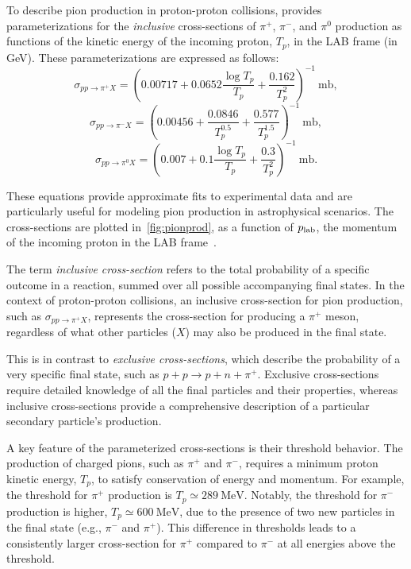 To describe pion production in proton-proton collisions, \cite{Norbury2009nimpb} provides parameterizations for the \emph{inclusive} cross-sections of \(\pi^+\), \(\pi^-\), and \(\pi^0\) production as functions of the kinetic energy of the incoming proton, \(T_p\), in the LAB frame (in GeV). These parameterizations are expressed as follows:  
\begin{equation}
\sigma_{pp \rightarrow \pi^+ X} = \left( 0.00717 + 0.0652 \frac{\log T_p}{T_p} + \frac{0.162}{T_p^2} \right)^{-1}~\text{mb}, 
\end{equation}
\begin{equation}
\sigma_{pp \rightarrow \pi^- X} = \left( 0.00456 + \frac{0.0846}{T_p^{0.5}} + \frac{0.577}{T_p^{1.5}} \right)^{-1}~\text{mb}, 
\end{equation}
\begin{equation}
\sigma_{pp \rightarrow \pi^0 X} = \left( 0.007 + 0.1 \frac{\log T_p}{T_p} + \frac{0.3}{T_p^2} \right)^{-1}~\text{mb}.
\end{equation}  

These equations provide approximate fits to experimental data and are particularly useful for modeling pion production in astrophysical scenarios. The cross-sections are plotted in~\ref{fig:pionprod}, as a function of \(p_{\rm lab}\), the momentum of the incoming proton in the LAB frame~.  

The term \emph{inclusive cross-section} refers to the total probability of a specific outcome in a reaction, summed over all possible accompanying final states. In the context of proton-proton collisions, an inclusive cross-section for pion production, such as \(\sigma_{pp \rightarrow \pi^+ X}\), represents the cross-section for producing a \(\pi^+\) meson, regardless of what other particles (\(X\)) may also be produced in the final state.  

This is in contrast to \emph{exclusive cross-sections}, which describe the probability of a very specific final state, such as \(p + p \rightarrow p + n + \pi^+\). Exclusive cross-sections require detailed knowledge of all the final particles and their properties, whereas inclusive cross-sections provide a comprehensive description of a particular secondary particle's production.  

A key feature of the parameterized cross-sections is their threshold behavior. The production of charged pions, such as \(\pi^+\) and \(\pi^-\), requires a minimum proton kinetic energy, \(T_p\), to satisfy conservation of energy and momentum. For example, the threshold for \(\pi^+\) production is \(T_p \simeq 289~\text{MeV}\). Notably, the threshold for \(\pi^-\) production is higher, \(T_p \simeq 600~\text{MeV}\), due to the presence of two new particles in the final state (e.g., \(\pi^-\) and \(\pi^+\)).  
%
This difference in thresholds leads to a consistently larger cross-section for \(\pi^+\) compared to \(\pi^-\) at all energies above the threshold.  

